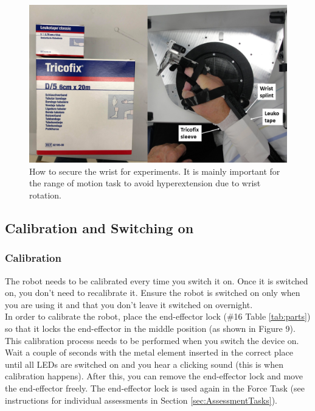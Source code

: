 \documentclass[10pt,oneside,a4paper]{article}
\begin{document}
\begin{figure}[h!]
\begin{center}
\includegraphics[width=\columnwidth]{images/Hardware/WristSplint.png}
\caption{How to secure the wrist for experiments. It is mainly important for the range of motion task to avoid hyperextension due to wrist rotation.}
\label{fig:WristSplint}
\end{center}
\end{figure}

\subsection{Calibration and Switching on}
\subsubsection*{Calibration}
The robot needs to be calibrated every time you switch it on. Once it is switched on, you don’t need to recalibrate it. Ensure the robot is switched on only when you are using it and that you don’t leave it switched on overnight. \\

In order to calibrate the robot, place the end-effector lock (\#16 Table \ref{tab:parts}) so that it locks the end-effector in the middle position (as shown in Figure 9). \\

This calibration process needs to be performed when you switch the device on. Wait a couple of seconds with the metal element inserted in the correct place until all LEDs are switched on and you hear a clicking sound (this is when calibration happens). After this, you can remove the end-effector lock and move the end-effector freely. The end-effector lock is used again in the Force Task (see instructions for individual assessments in Section \ref{sec:AssessmentTasks}). \\
\end{document}
